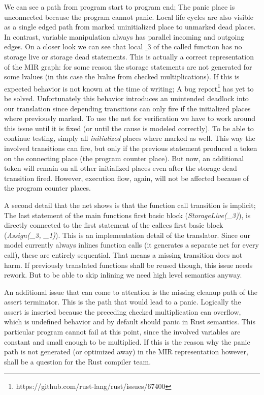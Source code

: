 We can see a path from program start to program end;
The panic place is unconnected because the program cannot panic.
Local life cycles are also visible as a single edged path from marked uninitialized place to unmarked dead places.
In contrast, variable manipulation always has parallel incoming and outgoing edges.
On a closer look we can see that local $\_3$ of the called function has no storage live or storage dead statements.
This is actually a correct representation of the MIR graph:
for some reason the storage statements are not generated for some lvalues (in this case the lvalue from checked multiplications).
If this is expected behavior is not known at the time of writing;
A bug report\footnote{https://github.com/rust-lang/rust/issues/67400} has yet to be solved.
Unfortunately this behavior introduces an unintended deadlock into our translation since depending transitions can only fire if the initialized places where previously marked.
To use the net for verification we have to work around this issue until it is fixed (or until the cause is modeled correctly).
To be able to continue testing, simply all \textit{initialized} places where marked as well.
This way the involved transitions can fire, but only if the previous statement produced a token on the connecting place (the program counter place).
But now, an additional token will remain on all other initialized places even after the storage dead transition fired.
However, execution flow, again, will not be affected because of the program counter places.

A second detail that the net shows is that the function call transition is implicit;
The last statement of the main functions first basic block (\textit{StorageLive(\_3)}), is directly connected to the first statement of the callees first basic block (\textit{Assign(\_3, \_1)}).
This is an implementation detail of the translator.
Since our model currently always inlines function calls (it generates a separate net for every call), these are entirely sequential.
That means a missing transition does not harm.
If previously translated functions shall be reused though, this issue needs rework.
But to be able to skip inlining we need high level semantics anyway.

An additional issue that can come to attention is the missing cleanup path of the assert terminator.
This is the path that would lead to a panic.
Logically the assert is inserted because the preceding checked multiplication can overflow, which is undefined behavior and by default should panic in Rust semantics.
This particular program cannot fail at this point, since the involved variables are constant and small enough to be multiplied.
If this is the reason why the panic path is not generated (or optimized away) in the MIR representation however, shall be a question for the Rust compiler team.

